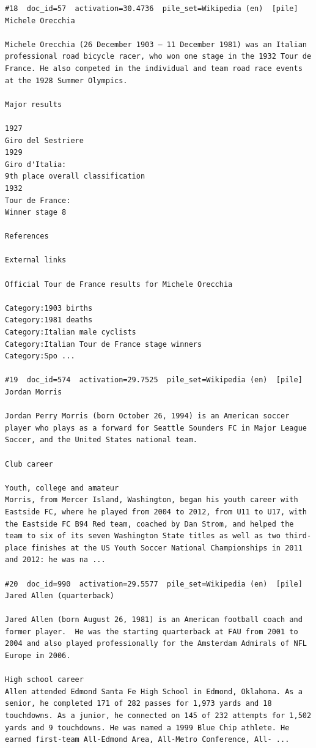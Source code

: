 \begin{verbatim}
#18  doc_id=57  activation=30.4736  pile_set=Wikipedia (en)  [pile]
Michele Orecchia

Michele Orecchia (26 December 1903 – 11 December 1981) was an Italian professional road bicycle racer, who won one stage in the 1932 Tour de France. He also competed in the individual and team road race events at the 1928 Summer Olympics.

Major results

1927
Giro del Sestriere
1929
Giro d'Italia:
9th place overall classification
1932
Tour de France:
Winner stage 8

References

External links

Official Tour de France results for Michele Orecchia

Category:1903 births
Category:1981 deaths
Category:Italian male cyclists
Category:Italian Tour de France stage winners
Category:Spo ...

#19  doc_id=574  activation=29.7525  pile_set=Wikipedia (en)  [pile]
Jordan Morris

Jordan Perry Morris (born October 26, 1994) is an American soccer player who plays as a forward for Seattle Sounders FC in Major League Soccer, and the United States national team.

Club career

Youth, college and amateur
Morris, from Mercer Island, Washington, began his youth career with Eastside FC, where he played from 2004 to 2012, from U11 to U17, with the Eastside FC B94 Red team, coached by Dan Strom, and helped the team to six of its seven Washington State titles as well as two third-place finishes at the US Youth Soccer National Championships in 2011 and 2012: he was na ...

#20  doc_id=990  activation=29.5577  pile_set=Wikipedia (en)  [pile]
Jared Allen (quarterback)

Jared Allen (born August 26, 1981) is an American football coach and former player.  He was the starting quarterback at FAU from 2001 to 2004 and also played professionally for the Amsterdam Admirals of NFL Europe in 2006.

High school career 
Allen attended Edmond Santa Fe High School in Edmond, Oklahoma. As a senior, he completed 171 of 282 passes for 1,973 yards and 18 touchdowns. As a junior, he connected on 145 of 232 attempts for 1,502 yards and 9 touchdowns. He was named a 1999 Blue Chip athlete. He earned first-team All-Edmond Area, All-Metro Conference, All- ...

\end{verbatim}

